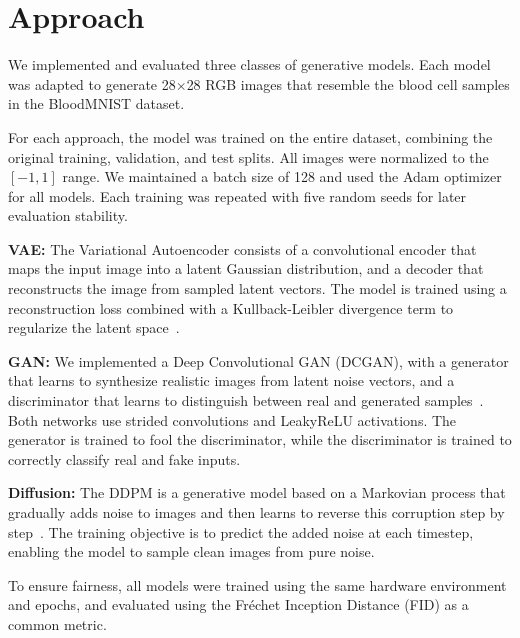 \section{Approach}

We implemented and evaluated three classes of generative models. Each model was adapted to generate 28$\times$28 RGB images that resemble the blood cell samples in the BloodMNIST dataset.

For each approach, the model was trained on the entire dataset, combining the original training, validation, and test splits. All images were normalized to the $[-1, 1]$ range. We maintained a batch size of 128 and used the Adam optimizer for all models. Each training was repeated with five random seeds for later evaluation stability.

\textbf{VAE:} The Variational Autoencoder consists of a convolutional encoder that maps the input image into a latent Gaussian distribution, and a decoder that reconstructs the image from sampled latent vectors. The model is trained using a reconstruction loss combined with a Kullback-Leibler divergence term to regularize the latent space~\cite{kingma2013auto}.

\textbf{GAN:} We implemented a Deep Convolutional GAN (DCGAN), with a generator that learns to synthesize realistic images from latent noise vectors, and a discriminator that learns to distinguish between real and generated samples~\cite{goodfellow2014generative}. Both networks use strided convolutions and LeakyReLU activations. The generator is trained to fool the discriminator, while the discriminator is trained to correctly classify real and fake inputs.

\textbf{Diffusion:} The DDPM is a generative model based on a Markovian process that gradually adds noise to images and then learns to reverse this corruption step by step~\cite{ho2020denoising}. The training objective is to predict the added noise at each timestep, enabling the model to sample clean images from pure noise.

To ensure fairness, all models were trained using the same hardware environment and epochs, and evaluated using the Fréchet Inception Distance (FID) as a common metric.